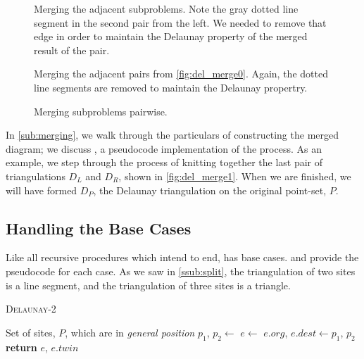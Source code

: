 \documentclass[12pt,twoside]{reedthesis}
\begin{document}
    \begin{figure}[!htb]
    \centering
      \begin{subtable}{\textwidth}
        \centering
        
        \caption{Merging the adjacent subproblems. Note the gray dotted line segment in the second pair from the left. We needed to remove that edge in order to maintain the Delaunay property of the merged result of the pair.}
        \label{fig:del_merge0}
      \end{subtable}

      \begin{subtable}{\textwidth}
        \centering
        
        \caption{Merging the adjacent pairs from \cref{fig:del_merge0}. Again, the dotted line segments are removed to maintain the Delaunay propertry.}
        \label{fig:del_merge1}
      \end{subtable}
      \caption{Merging subproblems pairwise.}
      \label{fig:del_merge_not_final}
    \end{figure}

    In \cref{sub:merging}, we walk through the particulars of constructing the merged diagram; we discuss , a pseudocode implementation of the process. As an example, we step through the process of knitting together the last pair of triangulations $D_{L}$ and $D_{R}$, shown in \cref{fig:del_merge1}. When we are finished, we will have formed $D_{P}$, the Delaunay triangulation on the original point-set, $P$.\par 


  \subsection{Handling the Base Cases} %
  \label{sub:handling_the_base_cases}
    Like all recursive procedures which intend to end,  has base cases.  and  provide the pseudocode for each case. As we saw in \cref{ssub:split}, the triangulation of two sites is a line segment, and the triangulation of three sites is a triangle. \par
    \begin{algorithm}[!htb]
    \caption{\textsc{Delaunay-2}}\label{bc_del_2}
    \begin{algorithmic}[1]
    \Require Set of sites, $P$, which are in \emph{general position}
      \State $p_{1}$, $p_{2}\gets$  \label{sort_1}
      \State $e\gets$\label{make_edge1}
      \State $e.org$, $e.dest \gets p_{1}$, $p_{2}$
      \State \textbf{return} $e$, $e.twin$ \label{return_1}
    \EndProcedure
    \end{algorithmic} 
    \end{algorithm}
\end{document}
